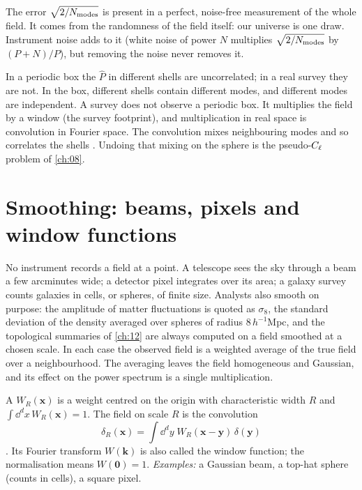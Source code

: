 \begin{pitfall}
The error $\sqrt{2/N_{\rm modes}}$ is present in a perfect, noise-free measurement
of the whole field. It comes from the randomness of the field itself: our
universe is one draw. Instrument noise adds to it (white noise of power $N$
multiplies $\sqrt{2/N_{\rm modes}}$ by $(P+N)/P$), but removing the noise never
removes it.
\end{pitfall}

In a periodic box the $\hat P$ in different shells are uncorrelated; in a real
survey they are not. In the box, different shells contain different modes, and
different modes are independent. A survey does not observe a periodic box. It
multiplies the field by a window (the survey footprint), and multiplication in
real space is convolution in Fourier space. The convolution mixes neighbouring
modes and so correlates the shells . Undoing that mixing on
the sphere is the pseudo-$C_\ell$ problem of \cref{ch:08}.
\section{Smoothing: beams, pixels and window functions}
\label{7a:sec:smoothing}

No instrument records a field at a point. A telescope sees the sky through a beam
a few arcminutes wide; a detector pixel integrates over its area; a galaxy survey
counts galaxies in cells, or spheres, of finite size. Analysts also smooth on
purpose: the amplitude of matter fluctuations is quoted as $\sigma_8$, the
standard deviation of the density averaged over spheres of radius
$8\,h^{-1}$Mpc, and the topological summaries of \cref{ch:12} are always computed
on a field smoothed at a chosen scale. In each case the observed field is a
weighted average of the true field over a neighbourhood. The averaging leaves
the field homogeneous and Gaussian, and its effect on the power spectrum is a
single multiplication.

\begin{workdef}
A  $W_R(\bm x)$ is a weight centred on the origin with
characteristic width $R$ and $\int\dd^dx\,W_R(\bm x)=1$. The field
 on scale $R$ is the convolution
\begin{equation}
  \delta_R(\bm x)=\int\dd^dy\;W_R(\bm x-\bm y)\,\delta(\bm y)
  \label{7a:eq:smooth}
\end{equation}
.
Its Fourier transform $W(\bm k)$ is also called the window function; the
normalisation means $W(\bm 0)=1$.
\emph{Examples:} a Gaussian beam, a top-hat sphere (counts in cells), a square
pixel.
\end{workdef}

